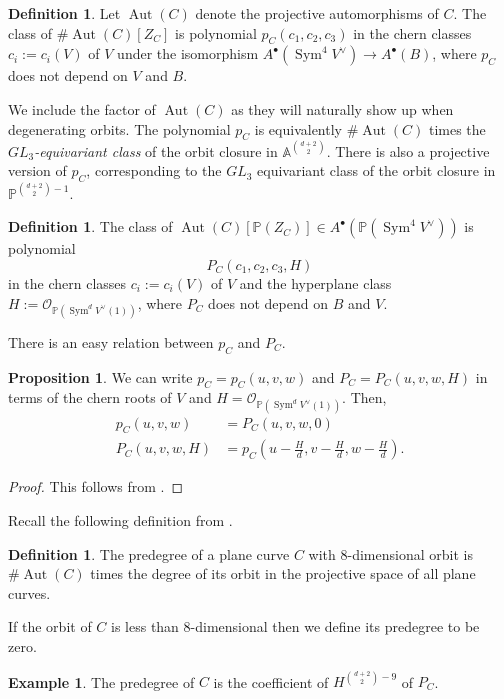 \documentclass{article}
\theoremstyle{definition}
\newtheorem{prop}[thm]{Proposition}
\newtheorem{defn}[thm]{Definition}
\newtheorem{exmp}[thm]{Example}
\newcommand{\on}{\operatorname}
\newcommand{\mb}{\mathbb}
\newcommand{\ms}{\mathscr}
\begin{document}
\begin{defn}
\label{orbitthomdef}
Let $\on{Aut}(C)$ denote the projective automorphisms of $C$. The class of $\#\on{Aut}(C)[Z_C]$ is polynomial $p_C(c_1,c_2,c_3)$ in the chern classes $c_i:=c_i(V)$ of $V$ under the isomorphism $A^{\bullet}(\on{Sym}^4V^{\vee})\to A^{\bullet}(B)$, where $p_C$ does not depend on $V$ and $B$. 
\end{defn}

We include the factor of $\on{Aut}(C)$ as they will naturally show up when degenerating orbits. The polynomial $p_C$ is equivalently $\#\on{Aut}(C)$ times the \emph{$GL_3$-equivariant class} of the orbit closure in $\mb{A}^{\binom{d+2}{2}}$. There is also a projective version of $p_C$, corresponding to the $GL_3$ equivariant class of the orbit closure in $\mb{P}^{\binom{d+2}{2}-1}$. 

\begin{defn}
\label{orbitthomdef}
The class of $\on{Aut}(C)[\mb{P}(Z_C)]\in  A^{\bullet}(\mb{P}(\on{Sym}^4V^{\vee}))$ is polynomial 
$$P_C(c_1,c_2,c_3,H)$$ in the chern classes $c_i:=c_i(V)$ of $V$ and the hyperplane class $H:=\ms{O}_{\mb{P}(\on{Sym}^dV^{\vee}(1))}$, where $P_C$ does not depend on $B$ and $V$.
\end{defn}

There is an easy relation between $p_C$ and $P_C$.

\begin{prop}
\label{projectivethom}
We can write $p_C=p_C(u,v,w)$ and $P_C=P_C(u,v,w,H)$ in terms of the chern roots of $V$ and $H=\ms{O}_{\mb{P}(\on{Sym}^dV^{\vee}(1))}$. Then,
\begin{align*}
    p_C(u,v,w)&=P_C(u,v,w,0)\\
    P_C(u,v,w,H)&= p_C(u-\frac{H}{d},v-\frac{H}{d},w-\frac{H}{d}).
\end{align*}
\end{prop}
\begin{proof}
This follows from \cite[Theorem 6.1]{FNR05}.
\end{proof}

Recall the following definition from \cite{AF00}.
\begin{defn}
\label{predegree}
The predegree of a plane curve $C$ with 8-dimensional orbit is $\#\on{Aut}(C)$ times the degree of its orbit in the projective space of all plane curves. 

If the orbit of $C$ is less than 8-dimensional then we define its predegree to be zero. 
\end{defn}
\begin{exmp}
The predegree of $C$ is the coefficient of $H^{\binom{d+2}{2}-9}$ of $P_C$. 
\end{exmp}
\end{document}
